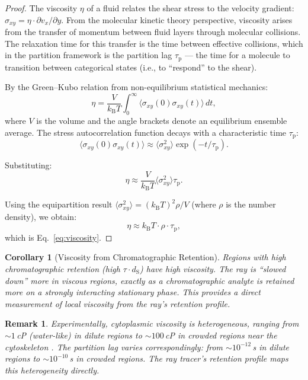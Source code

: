 \documentclass[11pt,twocolumn,a4paper]{article}
\newtheorem{corollary}[theorem]{Corollary}
\newtheorem{remark}[theorem]{Remark}
\newcommand{\kb}{k_{\mathrm{B}}}
\newcommand{\taup}{\tau_{\mathrm{p}}}
\newcommand{\dS}{d_{\mathrm{S}}}
\begin{document}
\begin{proof}
The viscosity $\eta$ of a fluid relates the shear stress to the
velocity gradient: $\sigma_{xy} = \eta \cdot \partial v_x/\partial y$.
From the molecular kinetic theory perspective, viscosity arises from
the transfer of momentum between fluid layers through molecular
collisions. The relaxation time for this transfer is the time between
effective collisions, which in the partition framework is the partition
lag $\taup$ --- the time for a molecule to transition between
categorical states (i.e., to ``respond'' to the shear).

By the Green--Kubo relation from non-equilibrium statistical
mechanics:
\begin{equation}
\eta = \frac{V}{\kb T} \int_0^\infty
  \langle \sigma_{xy}(0) \sigma_{xy}(t) \rangle \, dt,
\label{eq:green-kubo}
\end{equation}
where $V$ is the volume and the angle brackets denote an equilibrium
ensemble average. The stress autocorrelation function decays with a
characteristic time $\taup$:
\begin{equation}
\langle \sigma_{xy}(0) \sigma_{xy}(t) \rangle \approx
  \langle \sigma_{xy}^2 \rangle \exp(-t/\taup).
\end{equation}

Substituting:
\begin{equation}
\eta \approx \frac{V}{\kb T} \langle \sigma_{xy}^2 \rangle \taup.
\end{equation}

Using the equipartition result $\langle \sigma_{xy}^2 \rangle =
(\kb T)^2 \rho / V$ (where $\rho$ is the number density), we obtain:
\begin{equation}
\eta \approx \kb T \cdot \rho \cdot \taup,
\end{equation}
which is Eq.~\eqref{eq:viscosity}.
\end{proof}

\begin{corollary}[Viscosity from Chromatographic Retention]
\label{cor:viscosity-retention}
Regions with high chromatographic retention (high $\tau \cdot \dS$)
have high viscosity. The ray is ``slowed down'' more in viscous regions,
exactly as a chromatographic analyte is retained more on a strongly
interacting stationary phase. This provides a direct measurement of
local viscosity from the ray's retention profile.
\end{corollary}

\begin{remark}
Experimentally, cytoplasmic viscosity is heterogeneous, ranging from
$\sim\!1$\,cP (water-like) in dilute regions to $\sim\!100$\,cP in
crowded regions near the cytoskeleton \citep{luby1999}. The partition
lag varies correspondingly: from $\sim\!10^{-12}$\,s in dilute regions
to $\sim\!10^{-10}$\,s in crowded regions. The ray tracer's retention
profile maps this heterogeneity directly.
\end{remark}
\end{document}
